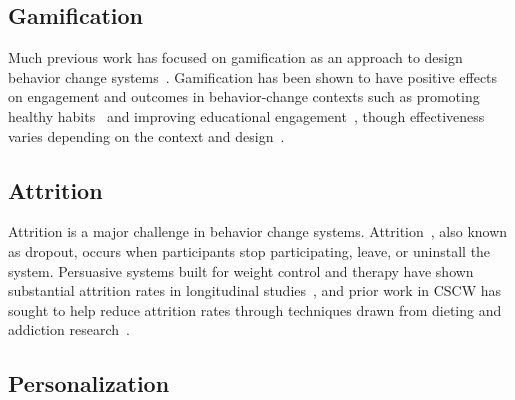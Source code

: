 

\subsection{Gamification}

Much previous work has focused on gamification as an approach to design behavior change systems~\cite{deterding2011game}. Gamification has been shown to have positive effects on engagement and outcomes in behavior-change contexts such as promoting healthy habits~\cite{cugelman2013gamification, lyons2014behavior} and improving  educational engagement~\cite{anderson2013steering, anderson2014engaging}, though effectiveness varies depending on the context and design~\cite{6758978}. %

\subsection{Attrition}

Attrition is a major challenge in behavior change systems. Attrition~\cite{eysenbach2005law}, also known as dropout, occurs when participants stop participating, leave, or uninstall the system. Persuasive systems built for weight control and therapy have shown substantial attrition rates in longitudinal studies~\cite{Bernier1986,paredes2014poptherapy}, and prior work in CSCW has sought to help reduce attrition rates through techniques drawn from dieting and addiction research~\cite{agapie2016staying}. %

\subsection{Personalization}

